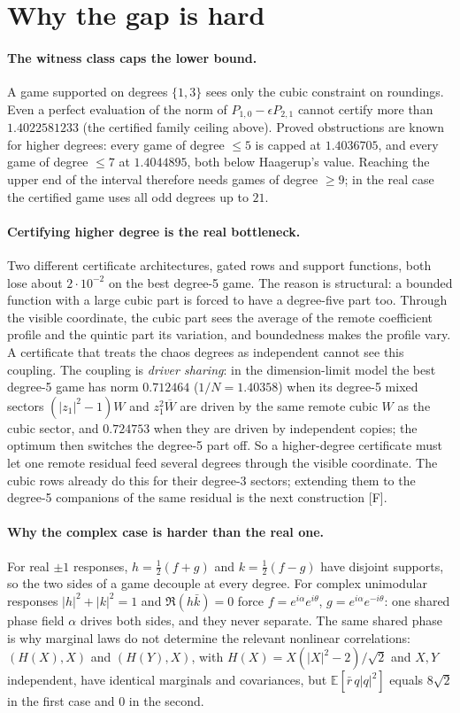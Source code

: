 \documentclass[11pt,a4paper]{article}
\newcommand{\E}{\mathbb{E}}
\begin{document}
\section{Why the gap is hard}
\paragraph{The witness class caps the lower bound.} A game supported on degrees $\{1,3\}$ sees only the cubic constraint on
roundings. Even a perfect evaluation of the norm of $P_{1,0}-\epsilon P_{2,1}$ cannot certify more than $1.4022581233$
(the certified family ceiling above). Proved obstructions are known for higher degrees: every game of degree $\le5$ is
capped at $1.4036705$, and every game of degree $\le7$ at $1.4044895$, both below Haagerup's value. Reaching the upper
end of the interval therefore needs games of degree $\ge9$; in the real case the certified game uses all odd degrees up to
$21$.

\paragraph{Certifying higher degree is the real bottleneck.} Two different certificate architectures, gated rows and
support functions, both lose about $2\cdot10^{-2}$ on the best degree-5 game. The reason is structural: a bounded function
with a large cubic part is forced to have a degree-five part too. Through the visible coordinate, the cubic part sees the
average of the remote coefficient profile and the quintic part its variation, and boundedness makes the profile vary. A
certificate that treats the chaos degrees as independent cannot see this coupling.
The coupling is \emph{driver sharing}: in the dimension-limit model the best degree-5 game has norm $0.712464$
($1/N=1.40358$) when its degree-5 mixed sectors $(|z_1|^2-1)W$ and $z_1^2\overline W$ are driven by the same remote cubic $W$ as
the cubic sector, and $0.724753$ when they are driven by independent copies; the optimum then switches the degree-5 part off.
So a higher-degree certificate must let one remote residual feed several degrees through the visible coordinate. The cubic
rows already do this for their degree-3 sectors; extending them to the degree-5 companions of the same residual is the
next construction [F].

\paragraph{Why the complex case is harder than the real one.} For real $\pm1$ responses, $h=\frac12(f+g)$ and
$k=\frac12(f-g)$ have disjoint supports, so the two sides of a game decouple at every degree. For complex unimodular
responses $|h|^2+|k|^2=1$ and $\Re(h\bar k)=0$ force $f=e^{i\alpha}e^{i\theta}$, $g=e^{i\alpha}e^{-i\theta}$: one shared
phase field $\alpha$ drives both sides, and they never separate. The same shared phase is why marginal laws do not
determine the relevant nonlinear correlations: $(H(X),X)$ and $(H(Y),X)$, with $H(X)=X(|X|^2-2)/\sqrt2$ and $X,Y$
independent, have identical marginals and covariances, but $\E[\bar r\,q|q|^2]$ equals $8\sqrt2$ in the first case and $0$
in the second.
\end{document}
